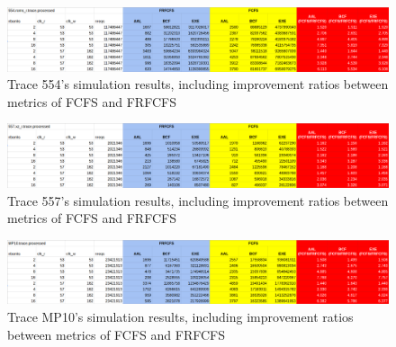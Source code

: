 \documentclass[letterpaper, 11pt]{article}
\begin{document}
\begin{figure}[htb!]
	\centering
	\includegraphics[width=1.0\linewidth]{554_results.png}
	\caption{Trace 554's simulation results, including improvement ratios between metrics of FCFS and FRFCFS}
	\label{fig3}
\end{figure}

\begin{figure}[htb!]
	\centering
	\includegraphics[width=1.0\linewidth]{557_results.png}
	\caption{Trace 557's simulation results, including improvement ratios between metrics of FCFS and FRFCFS}
	\label{fig4}
\end{figure}

\begin{figure}[htb!]
	\centering
	\includegraphics[width=1.0\linewidth]{MP10_results.png}
	\caption{Trace MP10's simulation results, including improvement ratios between metrics of FCFS and FRFCFS}
	\label{fig5}
\end{figure}
\end{document}
